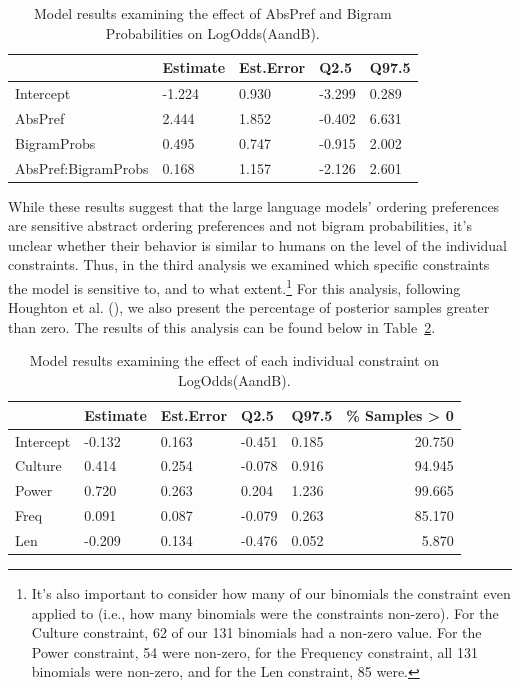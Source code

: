 \documentclass[
  12pt,
  letterpaper,
]{scrreprt}
\begin{document}
\begin{longtable}[]{@{}lllll@{}}

\caption{\label{tbl-exp1bigrams}Model results examining the effect of
AbsPref and Bigram Probabilities on LogOdds(AandB).}

\tabularnewline

\toprule\noalign{}
& Estimate & Est.Error & Q2.5 & Q97.5 \\
\midrule\noalign{}
\endhead
\bottomrule\noalign{}
\endlastfoot
Intercept & -1.224 & 0.930 & -3.299 & 0.289 \\
AbsPref & 2.444 & 1.852 & -0.402 & 6.631 \\
BigramProbs & 0.495 & 0.747 & -0.915 & 2.002 \\
AbsPref:BigramProbs & 0.168 & 1.157 & -2.126 & 2.601 \\

\end{longtable}

While these results suggest that the large language models' ordering
preferences are sensitive abstract ordering preferences and not bigram
probabilities, it's unclear whether their behavior is similar to humans
on the level of the individual constraints. Thus, in the third analysis
we examined which specific constraints the model is sensitive to, and to
what extent.\footnote{It's also important to consider how many of our
  binomials the constraint even applied to (i.e., how many binomials
  were the constraints non-zero). For the Culture constraint, 62 of our
  131 binomials had a non-zero value. For the Power constraint, 54 were
  non-zero, for the Frequency constraint, all 131 binomials were
  non-zero, and for the Len constraint, 85 were.} For this analysis,
following Houghton et al.
(),
we also present the percentage of posterior samples greater than zero.
The results of this analysis can be found below in
Table~\ref{tbl-exp1m2}.

\begin{longtable}[]{@{}lllllr@{}}

\caption{\label{tbl-exp1m2}Model results examining the effect of each
individual constraint on LogOdds(AandB).}

\tabularnewline

\toprule\noalign{}
& Estimate & Est.Error & Q2.5 & Q97.5 & \% Samples \textgreater{} 0 \\
\midrule\noalign{}
\endhead
\bottomrule\noalign{}
\endlastfoot
Intercept & -0.132 & 0.163 & -0.451 & 0.185 & 20.750 \\
Culture & 0.414 & 0.254 & -0.078 & 0.916 & 94.945 \\
Power & 0.720 & 0.263 & 0.204 & 1.236 & 99.665 \\
Freq & 0.091 & 0.087 & -0.079 & 0.263 & 85.170 \\
Len & -0.209 & 0.134 & -0.476 & 0.052 & 5.870 \\

\end{longtable}
\end{document}
